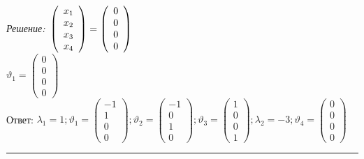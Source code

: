 \documentclass[a4paper, 12pt]{article}
\newenvironment{solution}
    {\textit{Решение: }}
    {\noindent\rule{7in}{1.5pt}}
\begin{document}
\begin{solution}
$
\\
\displaystyle
\left(\begin{array}{r}x_1\\x_2\\x_3\\x_4\end{array}\right)=\left(\begin{array}{r}0\\0\\0\\0\end{array}\right)
$
\\
$\displaystyle
\vartheta_1=\left(\begin{array}{r}0\\0\\0\\0\end{array}\right)
$
\\
Ответ: $\displaystyle
\lambda_1=1; \vartheta_1=\left(\begin{array}{r}-1\\1\\0\\0\end{array}\right); \vartheta_2=\left(\begin{array}{r}-1\\0\\1\\0\end{array}\right); \vartheta_3=\left(\begin{array}{r}1\\0\\0\\1\end{array}\right);
\lambda_2=-3; \vartheta_4=\left(\begin{array}{r}0\\0\\0\\0\end{array}\right)$

\end{solution}
\end{document}
